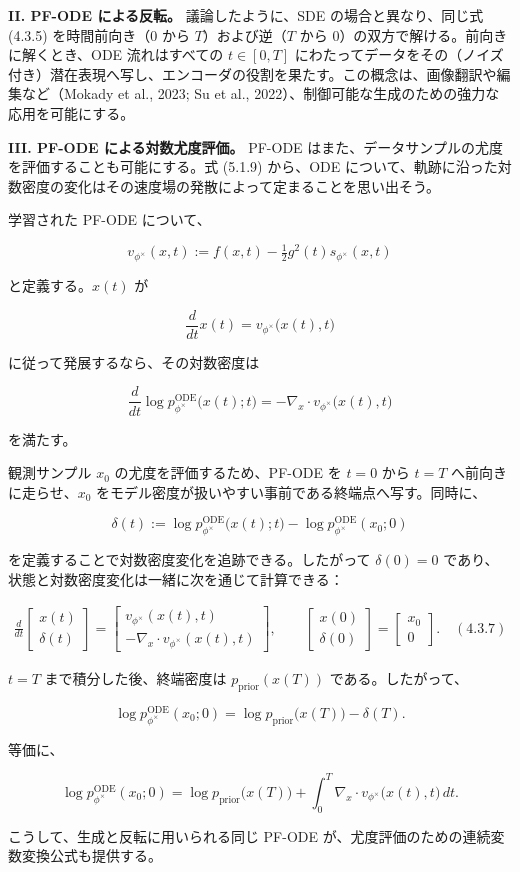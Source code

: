 \textbf{II. PF-ODE による反転。} 議論したように、SDE の場合と異なり、同じ式 (4.3.5) を時間前向き（$0$ から $T$）および逆（$T$ から $0$）の双方で解ける。前向きに解くとき、ODE 流れはすべての $t\in[0,T]$ にわたってデータをその（ノイズ付き）潜在表現へ写し、エンコーダの役割を果たす。この概念は、画像翻訳や編集など（Mokady et al., 2023; Su et al., 2022）、制御可能な生成のための強力な応用を可能にする。

\textbf{III. PF-ODE による対数尤度評価。} PF-ODE はまた、データサンプルの尤度を評価することも可能にする。式 (5.1.9) から、ODE について、軌跡に沿った対数密度の変化はその速度場の発散によって定まることを思い出そう。

学習された PF-ODE について、

\[
v_{\phi^\times}(x,t):=f(x,t)-\tfrac12 g^2(t)s_{\phi^\times}(x,t)
\]


と定義する。$x(t)$ が

\[
\frac{d}{dt}x(t)=v_{\phi^\times}\bigl(x(t),t\bigr)
\]


に従って発展するなら、その対数密度は

\[
\frac{d}{dt}\log p_{\phi^\times}^{\mathrm{ODE}}\bigl(x(t);t\bigr)
= -\nabla_x\cdot v_{\phi^\times}\bigl(x(t),t\bigr)
\]


を満たす。

観測サンプル $x_0$ の尤度を評価するため、PF-ODE を $t=0$ から $t=T$ へ前向きに走らせ、$x_0$ をモデル密度が扱いやすい事前である終端点へ写す。同時に、

\[
\delta(t):=\log p_{\phi^\times}^{\mathrm{ODE}}\bigl(x(t);t\bigr)-\log p_{\phi^\times}^{\mathrm{ODE}}(x_0;0)
\]


を定義することで対数密度変化を追跡できる。したがって $\delta(0)=0$ であり、状態と対数密度変化は一緒に次を通じて計算できる：

\begin{align*}
\frac{d}{dt}
\begin{bmatrix} x(t) \\ \delta(t) \end{bmatrix}
=
\begin{bmatrix}
v_{\phi^\times}(x(t),t) \\
-\nabla_x\cdot v_{\phi^\times}(x(t),t)
\end{bmatrix},
\qquad
\begin{bmatrix} x(0) \\ \delta(0) \end{bmatrix}
=
\begin{bmatrix} x_0 \\ 0 \end{bmatrix}. \quad (4.3.7)
\end{align*}


$t=T$ まで積分した後、終端密度は $p_{\mathrm{prior}}(x(T))$ である。したがって、

\[
\log p_{\phi^\times}^{\mathrm{ODE}}(x_0;0)=\log p_{\mathrm{prior}}\bigl(x(T)\bigr)-\delta(T).
\]


等価に、

\[
\log p_{\phi^\times}^{\mathrm{ODE}}(x_0;0)
= \log p_{\mathrm{prior}}\bigl(x(T)\bigr)
+ \int_0^T \nabla_x\cdot v_{\phi^\times}\bigl(x(t),t\bigr)\, dt.
\]


こうして、生成と反転に用いられる同じ PF-ODE が、尤度評価のための連続変数変換公式も提供する。


